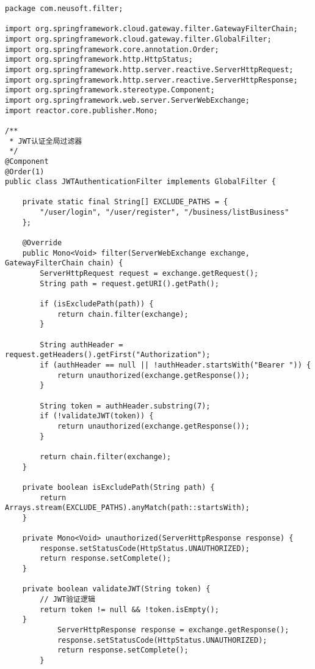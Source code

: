 \documentclass[a4paper,12pt]{article}
\begin{document}
\begin{lstlisting}[caption=JWT认证过滤器]
package com.neusoft.filter;

import org.springframework.cloud.gateway.filter.GatewayFilterChain;
import org.springframework.cloud.gateway.filter.GlobalFilter;
import org.springframework.core.annotation.Order;
import org.springframework.http.HttpStatus;
import org.springframework.http.server.reactive.ServerHttpRequest;
import org.springframework.http.server.reactive.ServerHttpResponse;
import org.springframework.stereotype.Component;
import org.springframework.web.server.ServerWebExchange;
import reactor.core.publisher.Mono;

/**
 * JWT认证全局过滤器
 */
@Component
@Order(1)
public class JWTAuthenticationFilter implements GlobalFilter {
    
    private static final String[] EXCLUDE_PATHS = {
        "/user/login", "/user/register", "/business/listBusiness"
    };
    
    @Override
    public Mono<Void> filter(ServerWebExchange exchange, GatewayFilterChain chain) {
        ServerHttpRequest request = exchange.getRequest();
        String path = request.getURI().getPath();
        
        if (isExcludePath(path)) {
            return chain.filter(exchange);
        }
        
        String authHeader = request.getHeaders().getFirst("Authorization");
        if (authHeader == null || !authHeader.startsWith("Bearer ")) {
            return unauthorized(exchange.getResponse());
        }
        
        String token = authHeader.substring(7);
        if (!validateJWT(token)) {
            return unauthorized(exchange.getResponse());
        }
        
        return chain.filter(exchange);
    }
    
    private boolean isExcludePath(String path) {
        return Arrays.stream(EXCLUDE_PATHS).anyMatch(path::startsWith);
    }
    
    private Mono<Void> unauthorized(ServerHttpResponse response) {
        response.setStatusCode(HttpStatus.UNAUTHORIZED);
        return response.setComplete();
    }
    
    private boolean validateJWT(String token) {
        // JWT验证逻辑
        return token != null && !token.isEmpty();
    }
            ServerHttpResponse response = exchange.getResponse();
            response.setStatusCode(HttpStatus.UNAUTHORIZED);
            return response.setComplete();
        }
        

\end{lstlisting}
\end{document}
